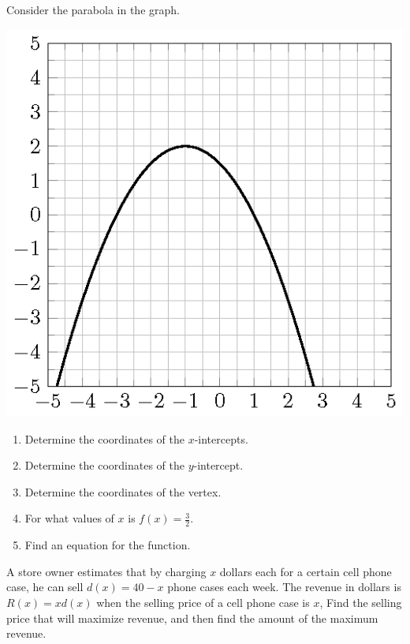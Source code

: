 \begin{exercise}

Consider the parabola in the graph.

\includegraphics{figs/tikz-exercise-graph-quadratic-2.png}

\begin{enumerate}
\item
  Determine the coordinates of the \(x\)-intercepts.
\item
  Determine the coordinates of the \(y\)-intercept.
\item
  Determine the coordinates of the vertex.
\item
  For what values of \(x\) is \(f(x)=\frac{3}{2}\).
\item
  Find an equation for the function.
\end{enumerate}

\end{exercise}

\begin{exercise}

A store owner estimates that by charging \(x\) dollars each for a
certain cell phone case, he can sell \(d(x)=40 - x\) phone cases each
week. The revenue in dollars is \(R(x)=xd(x)\) when the selling price of
a cell phone case is \(x\), Find the selling price that will maximize revenue,
and then find the amount of the maximum revenue.

\end{exercise}
\vspace*{6\baselineskip}

